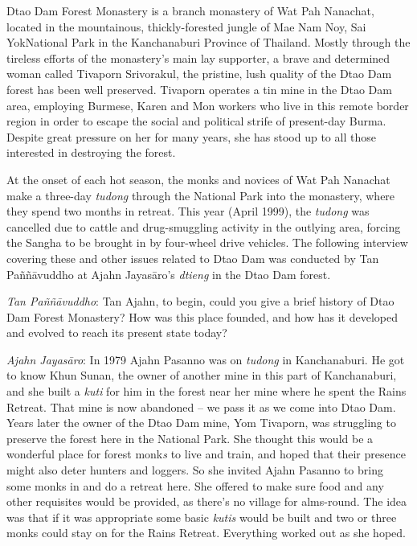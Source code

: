 
Dtao Dam Forest Monastery is a branch monastery of Wat Pah Nanachat, 
located in the mountainous, thickly-forested jungle of Mae Nam Noy, Sai
YokNational Park in the Kanchanaburi Province of Thailand. Mostly
through the tireless efforts of the monastery's main lay supporter, a
brave and determined woman called Tivaporn Srivorakul, the pristine, 
lush quality of the Dtao Dam forest has been well preserved. Tivaporn
operates a tin mine in the Dtao Dam area, employing Burmese, Karen and
Mon workers who live in this remote border region in order to escape the
social and political strife of present-day Burma. Despite great pressure
on her for many years, she has stood up to all those interested in
destroying the forest. 

At the onset of each hot season, the monks and novices of Wat Pah
Nanachat make a three-day \emph{tudong} through the National Park into
the monastery, where they spend two months in retreat. This year (April
 1999), the \emph{tudong} was cancelled due to cattle and
drug-smuggling activity in the outlying area, forcing the Sangha to be
brought in by four-wheel drive vehicles. The following interview
covering these and other issues related to Dtao Dam was conducted by Tan
Paññāvuddho at Ajahn Jayasāro's \emph{dtieng} in the Dtao Dam forest. 

\emph{Tan Paññāvuddho}: Tan Ajahn, to begin, could you give a brief
history of Dtao Dam Forest Monastery? How was this place founded, and
how has it developed and evolved to reach its present state today? 

\emph{Ajahn Jayasāro}: In 1979 Ajahn Pasanno was on \emph{tudong} in
Kanchanaburi. He got to know Khun Sunan, the owner of another mine in
this part of Kanchanaburi, and she built a \emph{kuti} for him in the
forest near her mine where he spent the Rains Retreat. That mine is now
abandoned -- we pass it as we come into Dtao Dam. Years later the owner
of the Dtao Dam mine, Yom Tivaporn, was struggling to preserve the
forest here in the National Park. She thought this would be a wonderful
place for forest monk\emph{s} to live and train, and hoped that their
presence might also deter hunters and loggers. So she invited Ajahn
Pasanno to bring some monks in and do a retreat here. She offered to
make sure food and any other requisites would be provided, as there's no
village for alms-round. The idea was that if it was appropriate some
basic \emph{kutis} would be built and two or three monks could stay on
for the Rains Retreat. Everything worked out as she hoped. 

